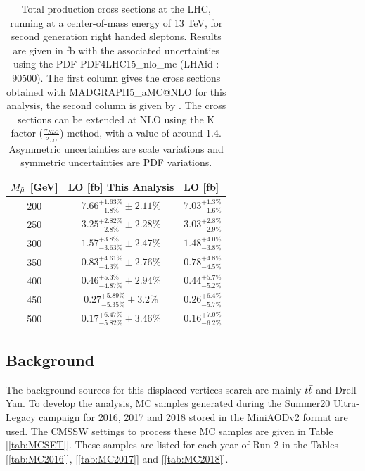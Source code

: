 \documentclass{cernatlasnote}
\begin{document}
\begin{table}
    \centering
    \begin{tabular}{ | c || c | m{6em} |}
        \hline
        \rowcolor{lightgray} 
         $M_{\Tilde{\mu}}$ [GeV]  & LO [fb] This Analysis & LO [fb] \cite{Fuks_2014} \\
         \hline
         \hline
         200 & $7.66^{+1.63\%}_{-1.8\%} \pm 2.11\% $  & $7.03^{+1.3\%}_{-1.6\%}$  \\
         \hline
         250  & $3.25^{+2.82\%}_{-2.8\%} \pm 2.28\%$   & $3.03^{+2.8\%}_{-2.9\%}$  \\
         \hline
         300  & $1.57^{+3.8\%}_{-3.63\%} \pm 2.47\%$ & $1.48^{+4.0\%}_{-3.8\%}$  \\
         \hline
         350  & $0.83^{+4.61\%}_{-4.3\%} \pm 2.76\% $  & $0.78^{+4.8\%}_{-4.5\%}$  \\
         \hline
         400   & $0.46^{+5.3\%}_{-4.87\%} \pm 2.94\%$ & $0.44^{+5.7\%}_{-5.2\%}$ \\
         \hline
         450   & $0.27^{+5.89\%}_{-5.35\%} \pm 3.2\%$   & $0.26^{+6.4\%}_{-5.7\%}$  \\
         \hline
         500  & $0.17^{+6.47\%}_{-5.82\%} \pm 3.46\%$   & $0.16^{+7.0\%}_{-6.2\%}$ \\
         \hline
    \end{tabular}
    \caption{Total production cross sections at the LHC, running at a center-of-mass  energy of 13 TeV, for second generation right handed sleptons. Results are given in fb with the associated uncertainties using the PDF PDF4LHC15\_nlo\_mc (LHAid : 90500). The first column gives the cross sections obtained with MADGRAPH5\_aMC@NLO for this analysis, the second column is given by \cite{Fuks_2014}. The cross sections can be extended at NLO using the K factor ($\frac{\sigma_{NLO}}{\sigma_{LO}}$) method, with a value of around 1.4. Asymmetric uncertainties are scale variations and symmetric uncertainties are PDF variations.} 
    \label{tab:RIGHTXS}
\end{table}
\FloatBarrier

\subsection{Background}

 The background sources for this displaced vertices search are mainly $t\Bar{t}$ and Drell-Yan.
To develop the analysis, MC samples generated during the Summer20 Ultra-Legacy campaign for 2016, 2017 and 2018 stored in the MiniAODv2 format are used. The CMSSW settings to process these MC samples are given in Table [\ref{tab:MCSET}].
These samples are listed for each year of Run 2 in the Tables [\ref{tab:MC2016}], [\ref{tab:MC2017}] and [\ref{tab:MC2018}].
\end{document}
